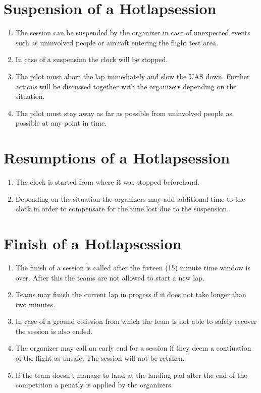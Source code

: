     \section{Suspension of a Hotlapsession}
    \begin{enumerate}
      \item The session can be suspended by the organizer in case of unexpected events such as uninvolved people or aircraft entering the flight test area. 
      \item In case of a suspension the clock will be stopped. 
      \item The pilot must abort the lap immediately and slow the UAS down. Further actions will be discussed together with the organizers depending on the situation.
      \item The pilot must stay away as far as possible from uninvolved people as possible at any point in time. 
    \end{enumerate}

    \section{Resumptions of a Hotlapsession }
    \begin{enumerate}
      \item The clock is started from where it was stopped beforehand.
      \item Depending on the situation the organizers may add additional time to the clock in order to compensate for the time lost due to the suspension. 
    \end{enumerate}

    \section{Finish of a Hotlapsession}
    \begin{enumerate}
      \item The finish of a session is called after the fivteen (15) minute time window is over. After this the teams are not allowed to start a new lap.
      \item Teams may finish the current lap in progess if it does not take longer than two minutes.
      \item In case of a ground colission from which the team is not able to safely recover the session is also ended. 
      \item The organizer may call an early end for a session if they deem a contiuation of the flight as unsafe. The session will not be retaken.  
      \item If the team doesn't manage to land at the landing pad after the end of the competition a penatly is applied by the organizers.
    \end{enumerate}


